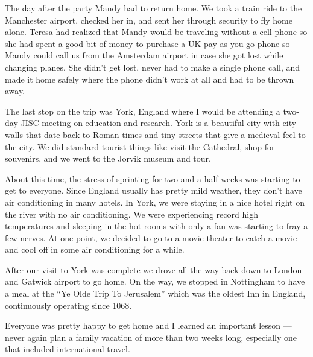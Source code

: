\documentclass[12pt]{book}
\begin{document}
The day after the party Mandy had to return home.  We took a
train ride to the Manchester airport, checked her in, and sent
her through security to fly home alone.  Teresa had realized that Mandy
would be traveling without a cell phone so she had spent a good bit
of money to purchase a UK pay-as-you go phone so Mandy could call us
from the Amsterdam airport in case she got lost while changing planes.
She didn't get lost, never had to make a single phone call,
and made it home safely where the phone didn't work at all and had to be thrown
away.

The last stop on the trip was York, England where I would be attending a
two-day JISC meeting on education and research.  York is a beautiful city
with city walls that date back to Roman times and tiny streets that
give a medieval feel to the city.   We did standard tourist things
like visit the Cathedral, shop for souvenirs, and we went to the Jorvik
museum and tour.

About this time, the stress of sprinting for two-and-a-half weeks was
starting to get to everyone.  Since England usually has pretty mild weather,
they don't have air conditioning in many hotels.  In York, we were staying
in a nice hotel right on the river with no air conditioning.
We were experiencing record high temperatures and sleeping in the hot rooms with
only a fan was starting to fray a few nerves.   At one point, we decided
to go to a movie theater to catch a movie and cool off in some air conditioning
for a while.


After our visit to York was complete we drove all the way back down to London
and Gatwick airport to go home.  On the way, we stopped in Nottingham to have
a meal at the ``Ye Olde Trip To Jerusalem'' which was the oldest Inn in England,
continuously operating since 1068.

Everyone was pretty happy to get home and I learned an important lesson ---
never again plan a family vacation of more than two weeks long, especially
one that included international travel.

\end{document}
